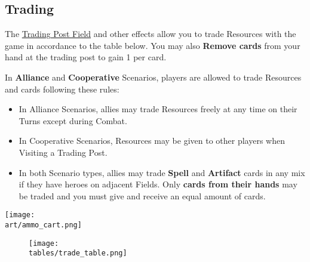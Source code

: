 \begin{multicols}{2}

\subsection*{\hypertarget{Trading}{Trading}}

The \hyperlink{Trading Post}{Trading Post Field} and other effects allow you to trade Resources with the game in accordance to the table below.
You may also \textbf{Remove cards} from your hand at the trading post to gain 1  per card.\par
{}\par
In \textbf{Alliance} and \textbf{Cooperative} Scenarios, players are allowed to trade Resources and cards following these rules:
\begin{itemize}
  \item In Alliance Scenarios, allies may trade Resources freely at any time on their Turns except during Combat.
  \item In Cooperative Scenarios, Resources may be given to other players when Visiting a Trading Post.
  \item In both Scenario types, allies may trade \textbf{Spell} and \textbf{Artifact} cards in any mix if they have heroes on adjacent Fields.
    Only \textbf{cards from their hands} may be traded and you must give and receive an equal amount of cards.
\end{itemize}

\vspace*{\fill}
\texttt{[image: \\art/ammo\_cart.png]}

\end{multicols}

\vfill
\begin{figure*}[!hb]
  \centering
  \texttt{[image: \\tables/trade\_table.png]}
\end{figure*}
\vfill

\clearpage

